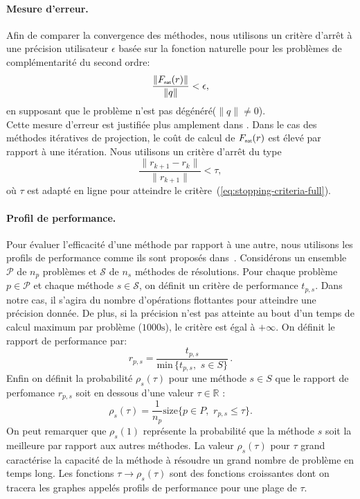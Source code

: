 \documentclass{CSMA2017}
\def\nat{{\hbox{\sf \tiny{nat}}}}
\begin{document}
\paragraph{Mesure d'erreur.} 
Afin de comparer la convergence des méthodes, nous utilisons un critère d'arrêt à une précision utilisateur $\epsilon$ basée sur la fonction naturelle pour les problèmes de complémentarité du second ordre:
\begin{equation}
  \label{eq:stopping-criteria-full}
  \displaystyle\frac{\|F_\nat(r)\|}{\|q\|} < \epsilon,
\end{equation}
en supposant que le problème n'est pas dégénéré($\|q\| \neq 0$). \\
%
Cette mesure d'erreur est justifiée plus amplement dans \cite{Facchinei.Pang2003}. Dans le cas des méthodes itératives de projection, le coût de calcul de $F_\nat(r)$ est élevé par rapport à une itération. Nous utilisons un critère d'arrêt du type 
\begin{equation}
  \label{eq:stopping-criteria-light}
  \displaystyle\frac{\|r_{k+1}- r_{k}\|}{\|r_{k+1}\|} < \tau,
\end{equation}
où $\tau$ est adapté en ligne pour atteindre le critère~(\ref{eq:stopping-criteria-full}).

\paragraph{Profil de performance.} 
Pour évaluer l'efficacité d'une méthode par rapport à une autre, nous utilisons les profils de performance comme ils sont proposés dans~\cite{DolanMore_MP2002}. Considérons un ensemble $\mathcal P$ de $n_p$ problèmes et $\mathcal S$  de $n_s$ méthodes de résolutions. Pour chaque problème $p\in \mathcal P$ et chaque méthode $s \in \mathcal S$, on définit un critère de performance $t_{p,s}$. Dans notre cas, il s'agira du nombre d'opérations flottantes pour atteindre une précision donnée. De plus, si la précision n'est pas atteinte au bout d'un temps de calcul maximum par problème ($1000\si{\second}$), le critère est égal à $+\infty$. On définit le rapport de performance par:  
\begin{equation}
 r_{p, s} = \frac{t_{p,s}}{\text{min}\, \{t_{p,s}, \, \, s \in S\}} \, .
\end{equation}
Enfin on définit la probabilité  $\rho_s(\tau)$ pour une méthode $s \in S$ que le rapport de perfomance $r_{p, s}$ soit en dessous d'une valeur $\tau \in \mathbb R$ :
\begin{equation}
 \rho_s(\tau) = \frac{1}{n_p} \text{size} \{p \in P, \, \, r_{p, s} \leq \tau\}. %
\end{equation}
On peut remarquer que $\rho_s(1)$ représente la probabilité que la méthode $s$ soit la meilleure par rapport aux autres méthodes. La valeur $\rho_s(\tau)$ pour $\tau$ grand caractérise la capacité de la méthode à résoudre un grand nombre de problème en temps long. Les fonctions $\tau \rightarrow \rho_s(\tau) $ sont des fonctions croissantes dont  on tracera les graphes appelés profils de performance pour une plage de $\tau$. 
\end{document}
